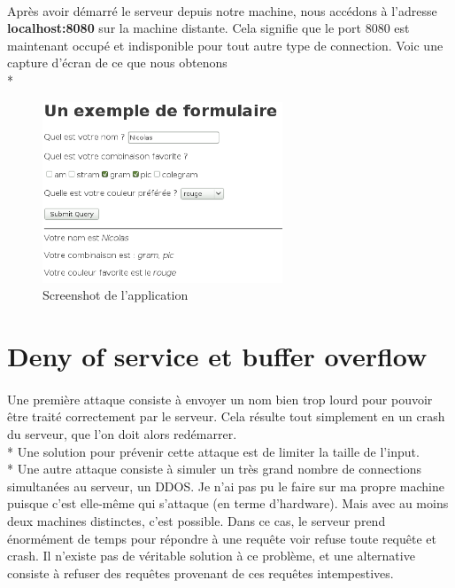 \documentclass{article}
\begin{document}
\paragraph{}
Après avoir démarré le serveur depuis notre machine, nous accédons à l'adresse \textbf{localhost:8080} sur la machine distante. Cela signifie que le port 8080 est maintenant occupé et indisponible pour tout autre type de connection. Voic une capture d'écran de ce que nous obtenons
\\*
\begin{figure}[h]
\begin{center}
\includegraphics[width=0.64\textwidth]{second}
\caption{Screenshot de l'application}
\end{center}
\end{figure}
\newpage

\section{Deny of service et buffer overflow}

\paragraph{}
Une première attaque consiste à envoyer un nom bien trop lourd pour pouvoir être traité correctement par le serveur. Cela résulte tout simplement en un crash du serveur, que l'on doit alors redémarrer. \\*
Une solution pour prévenir cette attaque est de limiter la taille de l'input. \\*
Une autre attaque consiste à simuler un très grand nombre de connections simultanées au serveur, un DDOS. Je n'ai pas pu le faire sur ma propre machine puisque c'est elle-même qui s'attaque (en terme d'hardware). Mais avec au moins deux machines distinctes, c'est possible. Dans ce cas, le serveur prend énormément de temps pour répondre à une requête voir refuse toute requête et crash. Il n'existe pas de véritable solution à ce problème, et une alternative consiste à refuser des requêtes provenant de ces requêtes intempestives.
\end{document}
